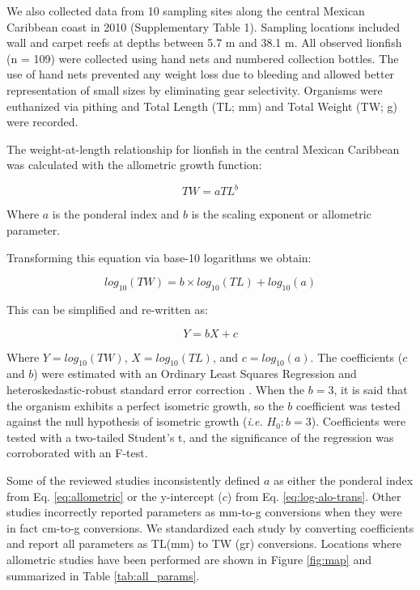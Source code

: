 \documentclass[fleqn,10pt,lineno]{wlpeerj} %
\begin{document}
We also collected data from 10 sampling sites along the central Mexican
Caribbean coast in 2010 (Supplementary Table 1). Sampling locations
included wall and carpet reefs at depths between 5.7 m and 38.1 m. All
observed lionfish (n = 109) were collected using hand nets and numbered
collection bottles. The use of hand nets prevented any weight loss due
to bleeding and allowed better representation of small sizes by
eliminating gear selectivity. Organisms were euthanized via pithing and
Total Length (TL; mm) and Total Weight (TW; g) were recorded.

The weight-at-length relationship for lionfish in the central Mexican
Caribbean was calculated with the allometric growth function:

\begin{equation}
\label{eq:allometric}
TW = aTL^b
\end{equation}

Where \(a\) is the ponderal index and \(b\) is the scaling exponent or
allometric parameter.

\clearpage

Transforming this equation via base-10 logarithms we obtain:

\begin{equation}
\label{eq:log-alo}
log_{10}(TW) = b\times log_{10}(TL) + log_{10}(a)
\end{equation}

This can be simplified and re-written as:

\begin{equation}
\label{eq:log-alo-trans}
Y = bX + c
\end{equation}

Where \(Y = log_{10}(TW)\), \(X = log_{10}(TL)\), and
\(c = log_{10}(a)\). The coefficients (\(c\) and \(b\)) were estimated
with an Ordinary Least Squares Regression and heteroskedastic-robust
standard error correction \citep{zeileis_2004}. When the \(b = 3\), it
is said that the organism exhibits a perfect isometric growth, so the
\(b\) coefficient was tested against the null hypothesis of isometric
growth (\emph{i.e.} \(H_0: b = 3\)). Coefficients were tested with a
two-tailed Student's t, and the significance of the regression was
corroborated with an F-test.

Some of the reviewed studies inconsistently defined \(a\) as either the
ponderal index from Eq. \ref{eq:allometric} or the y-intercept (\(c\))
from Eq. \ref{eq:log-alo-trans}. Other studies incorrectly reported
parameters as mm-to-g conversions when they were in fact cm-to-g
conversions. We standardized each study by converting coefficients and
report all parameters as TL(mm) to TW (gr) conversions. Locations where
allometric studies have been performed are shown in Figure \ref{fig:map}
and summarized in Table \ref{tab:all_params}.
\end{document}
